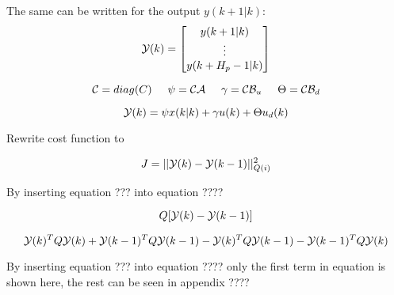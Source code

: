 The same can be written for the output $y(k+1|k)$:
\begin{equation}
	\CMcal{Y}(k)= 
	\begin{bmatrix}
	y(k+1|k)\\
	\vdots\\
	y(k+H_p-1|k)
	\end{bmatrix}
\end{equation}



\begin{equation}
	\CMcal{C} = diag(C) \hspace{5mm} \psi = \CMcal{C}\CMcal{A}  \hspace{5mm} \gamma = \CMcal{C}\CMcal{B}_u \hspace{5mm}  \Theta = \CMcal{C}\CMcal{B}_{d}
\end{equation}

\begin{equation}
	\CMcal{Y}(k) = \psi x(k|k) + \gamma u(k) + \Theta  u_d(k)
\end{equation}





Rewrite cost function to

\begin{equation}
	J = ||\CMcal{Y}(k)-\CMcal{Y}(k-1)||_{Q(i)}^2
\end{equation}

By inserting equation ??? into equation ????

\begin{equation}
	[\CMcal{Y}(k)^T - \CMcal{Y}(k-1)^T]Q[\CMcal{Y}(k) - \CMcal{Y}(k-1)]
\end{equation}



\begin{equation}
	\CMcal{Y}(k)^TQ\CMcal{Y}(k)+ \CMcal{Y}(k-1)^TQ\CMcal{Y}(k-1)-\CMcal{Y}(k)^TQ\CMcal{Y}(k-1)-\CMcal{Y}(k-1)^TQ\CMcal{Y}(k)
\end{equation}


By inserting equation ??? into equation ???? only the first term in equation is shown here, the rest can be seen in appendix ????

